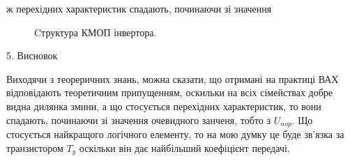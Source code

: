 \documentclass[a4paper,14pt]{extreport}
\begin{document}
ж перехідних характеристик спадають, починаючи зі значення

\begin{figure}[h]
\caption{Cтруктура КМОП інвертора.}
\end{figure}



\clearpage
\begin{center}5. Висновок\\ \end{center}
Виходячи з теореричних знань, можна сказати, що отримані на практиці ВАХ відповідають теоретичним припущенням, оскильки на всіх сімействах добре видна дилянка змини, а що стосується перехідних характеристик, то вони спадають, починаючи зі значення очевидного занченя, тобто з $U_{nop}$. Що стосується найкращого логічного елементу, то  на мою думку це буде зв'язка за транзистором $T_y$ оскільки він дає найбільший коефіцієнт передачі.
\end{document}
